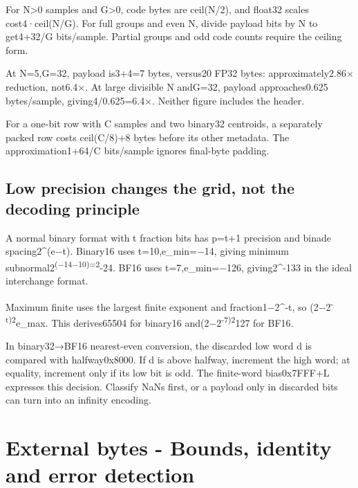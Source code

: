 \hypertarget{03-visual-computing-i-ch018-metadata-changes-the-compression-ratio}{}

For N\textgreater0 samples and G\textgreater0, code bytes are ceil(N/2), and float32 scales cost4·ceil(N/G). For full groups and even N, divide payload bits by N to get4+32/G bits/sample. Partial groups and odd code counts require the ceiling form.

At N=5,G=32, payload is3+4=7 bytes, versus20 FP32 bytes: approximately2.86× reduction, not6.4×. At large divisible N andG=32, payload approaches0.625 bytes/sample, giving4/0.625=6.4×. Neither figure includes the header.

For a one-bit row with C samples and two binary32 centroids, a separately packed row costs ceil(C/8)+8 bytes before its other metadata. The approximation1+64/C bits/sample ignores final-byte padding.

\subsection{Low precision changes the grid, not the decoding principle}\label{03-visual-computing-i-ch018-low-precision-changes-the-grid-not-the-decoding-principle}

\hypertarget{03-visual-computing-i-ch018-low-precision-changes-the-grid-not-the-decoding-principle}{}

A normal binary format with t fraction bits has p=t+1 precision and binade spacing2\^{}(e−t). Binary16 uses t=10,e\_min=−14, giving minimum subnormal2\textsuperscript{(−14−10)=2}-24. BF16 uses t=7,e\_min=−126, giving2\^{}-133 in the ideal interchange format.

Maximum finite uses the largest finite exponent and fraction1−2\^{}-t, so (2−2\textsuperscript{-t)2}e\_max. This derives65504 for binary16 and(2−2\textsuperscript{-7)2}127 for BF16.

In binary32→BF16 nearest-even conversion, the discarded low word d is compared with halfway0x8000. If d is above halfway, increment the high word; at equality, increment only if its low bit is odd. The finite-word bias0x7FFF+L expresses this decision. Classify NaNs first, or a payload only in discarded bits can turn into an infinity encoding.

\section{External bytes - Bounds, identity and error detection}\label{03-visual-computing-i-ch018-external-bytes---bounds-identity-and-error-detection}

